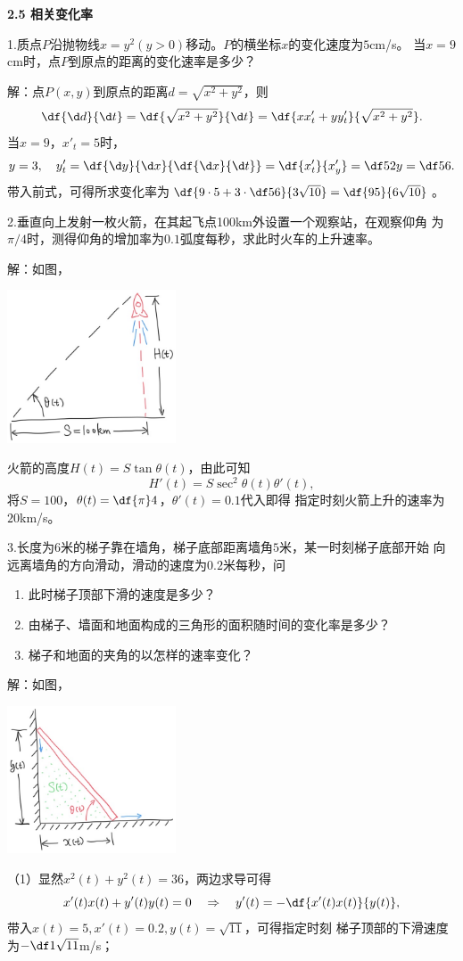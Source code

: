 \begin{center}
	\bf 2.5 相关变化率
\end{center}

\bigskip

1.质点$P$沿抛物线$x=y^2(y>0)$移动。$P$的横坐标$x$的变化速度为$5$cm/s。
当$x=9$cm时，点$P$到原点的距离的变化速率是多少？

解：点$P(x,y)$到原点的距离$d=\sqrt{x^2+y^2}$，则
$$\df{\d d}{\d t}=\df{\sqrt{x^2+y^2}}{\d t}
=\df{xx'_t+yy'_t}{\sqrt{x^2+y^2}}.$$
当$x=9$，$x'_t=5$时，
$$
	y=3,\quad
	y'_t=\df{\d y}{\d x}{\df{\d x}{\d t}}
	=\df{x'_t}{x'_y}=\df5{2y}=\df56.
$$
带入前式，可得所求变化率为$\df{9\cdot 5+3\cdot\df56}{3\sqrt{10}}
=\df{95}{6\sqrt{10}}$。\fin

\bigskip

2.垂直向上发射一枚火箭，在其起飞点100km外设置一个观察站，在观察仰角
为$\pi/4$时，测得仰角的增加率为$0.1$弧度每秒，求此时火车的上升速率。

解：如图，
\begin{center}
	\includegraphics[width=5cm]{./images/ch02/Rocket.jpg}
\end{center}
火箭的高度$H(t)=S\tan\theta(t)$，由此可知
$$H'(t)=S\sec^2\theta(t)\theta'(t),$$
将$S=100$，$\theta(t)=\df{\pi}4$，$\theta'(t)=0.1$代入即得
指定时刻火箭上升的速率为$20$km/s。\fin

\bigskip

3.长度为$6$米的梯子靠在墙角，梯子底部距离墙角$5$米，某一时刻梯子底部开始
向远离墙角的方向滑动，滑动的速度为$0.2$米每秒，问
\begin{enumerate}[(1)]
  \setlength{\itemindent}{1cm}
  \item 此时梯子顶部下滑的速度是多少？
  \item 由梯子、墙面和地面构成的三角形的面积随时间的变化率是多少？
  \item 梯子和地面的夹角的以怎样的速率变化？
\end{enumerate}

解：如图，
\begin{center}
	\includegraphics[width=5cm]{./images/ch02/ladder.jpg}
\end{center}
（1）显然$x^2(t)+y^2(t)=36$，两边求导可得
$$x'(t)x(t)+y'(t)y(t)=0\quad
\Rightarrow\quad y'(t)=-\df{x'(t)x(t)}{y(t)},$$
带入$x(t)=5,x'(t)=0.2,y(t)=\sqrt{11}$，可得指定时刻
梯子顶部的下滑速度为$-\df1{\sqrt{11}}$m/s；

